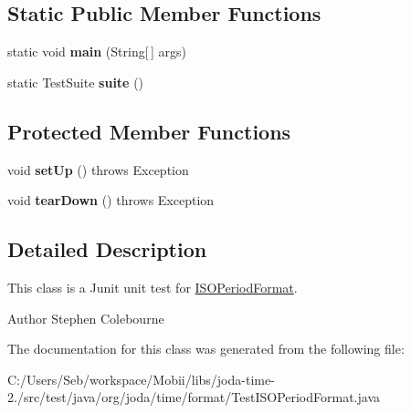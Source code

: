 \subsection*{Static Public Member Functions}
\begin{DoxyCompactItemize}
\item 
\hypertarget{classorg_1_1joda_1_1time_1_1format_1_1_test_i_s_o_period_format_a4d61ed7d2c2ff7cddad0cbd2204f5b61}{static void {\bfseries main} (String\mbox{[}$\,$\mbox{]} args)}\label{classorg_1_1joda_1_1time_1_1format_1_1_test_i_s_o_period_format_a4d61ed7d2c2ff7cddad0cbd2204f5b61}

\item 
\hypertarget{classorg_1_1joda_1_1time_1_1format_1_1_test_i_s_o_period_format_a3d0a52b5c5d6ff0e20ecc7ca01e40afd}{static Test\-Suite {\bfseries suite} ()}\label{classorg_1_1joda_1_1time_1_1format_1_1_test_i_s_o_period_format_a3d0a52b5c5d6ff0e20ecc7ca01e40afd}

\end{DoxyCompactItemize}
\subsection*{Protected Member Functions}
\begin{DoxyCompactItemize}
\item 
\hypertarget{classorg_1_1joda_1_1time_1_1format_1_1_test_i_s_o_period_format_a963ac388b8a97365cdf95116d678dbe4}{void {\bfseries set\-Up} ()  throws Exception }\label{classorg_1_1joda_1_1time_1_1format_1_1_test_i_s_o_period_format_a963ac388b8a97365cdf95116d678dbe4}

\item 
\hypertarget{classorg_1_1joda_1_1time_1_1format_1_1_test_i_s_o_period_format_a7ec53106ed41bc935b6c4e60cb1ec033}{void {\bfseries tear\-Down} ()  throws Exception }\label{classorg_1_1joda_1_1time_1_1format_1_1_test_i_s_o_period_format_a7ec53106ed41bc935b6c4e60cb1ec033}

\end{DoxyCompactItemize}


\subsection{Detailed Description}
This class is a Junit unit test for \hyperlink{classorg_1_1joda_1_1time_1_1format_1_1_i_s_o_period_format}{I\-S\-O\-Period\-Format}.

\begin{DoxyAuthor}{Author}
Stephen Colebourne 
\end{DoxyAuthor}


The documentation for this class was generated from the following file\-:\begin{DoxyCompactItemize}
\item 
C\-:/\-Users/\-Seb/workspace/\-Mobii/libs/joda-\/time-\/2./src/test/java/org/joda/time/format/Test\-I\-S\-O\-Period\-Format.\-java\end{DoxyCompactItemize}
